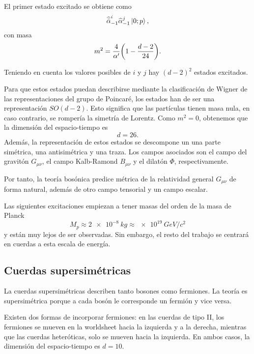 El primer estado excitado se obtiene como
\begin{equation}
  \widehat{\bar\alpha}_{-1}^i\widehat \alpha_{-1}^j\ket{0;p},
\end{equation}
con masa
\begin{equation}
  m^2 = \frac{4}{\alpha'}\qty(1-\frac{d-2}{24}).
\end{equation}

Teniendo en cuenta los valores posibles de $i$ y $j$ hay $(d-2)^2$ estados excitados.


Para que estos estados puedan describirse mediante la clasificación de Wigner de las
representaciones del grupo de Poincaré, los estados han de ser una representación $SO(d-2)$.
Esto significa que las partículas tienen masa nula, en caso contrario, se rompería la simetría
de Lorentz. Como $m^2=0$, obtenemos que la dimensión del espacio-tiempo es
\begin{equation}
  d=26.
\end{equation}
Además, la representación de estos estados se descompone un una parte simétrica, una antisimétrica
y una traza. Los campos asociados son el campo del gravitón $G_{\mu\nu}$, el campo Kalb-Ramond $B_{\mu\nu}$
y el dilatón $\Phi$, respectivamente.

Por tanto, la teoría bosónica predice métrica de la relatividad general $G_{\mu\nu}$ de forma 
natural, además de otro campo tensorial y un campo escalar.

Las siguientes excitaciones empiezan a tener masas del orden de la masa de Planck
\begin{equation}
  M_p\approx\SI{2e-8}{kg} \approx \SI{e19}{GeV/c^2}
\end{equation}
y están muy lejos de ser observadas. Sin embargo, el resto del trabajo se centrará en cuerdas
a esta escala de energía.


\subsection{Cuerdas supersimétricas}

La cuerdas supersimétricas describen tanto bosones como fermiones.
La teoría es supersimétrica porque a cada bosón le corresponde un fermión y vice versa.

Existen dos formas de incorporar fermiones:
en las cuerdas de tipo II, los fermiones se mueven en la worldsheet hacia la izquierda y a la derecha,
mientras que las cuerdas heteróticas, solo se mueven hacia la izquierda.
En ambos casos, la dimensión del espacio-tiempo es $d=10$.

